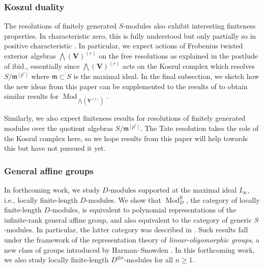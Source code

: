\documentclass[12pt]{amsart}
\newcommand{\bV}{\mathbf{V}}
\newcommand{\fm}{\mathfrak{m}}
\newcommand{\lw}{{\textstyle \bigwedge}}
\DeclareMathOperator{\Mod}{Mod}
\DeclareMathOperator{\lf}{lf}
\numberwithin{equation}{section}
\theoremstyle{definition}
\theoremstyle{plain}
\begin{document}
\subsubsection{Koszul duality}
The resolutions of finitely generated $S$-modules also exhibit interesting finiteness properties. In characteristic zero, this is fully understood \cite[Section~6 and 7]{ss16gl} but only partially so in positive characteristic \cite{gan24lnnr}. In particular, we expect actions of Frobenius twisted exterior algebras $\lw(\bV)^{(r)}$ on the free resolutions as explained in the postlude of ibid., essentially since $\lw(\bV)^{(r)}$ acts on the Koszul complex which resolves $S/\fm^{[p^r]}$ where $\fm \subset S$ is the maximal ideal. In the final subsection, we sketch how the new ideas from this paper can be supplemented to the results of \cite{gan22ext} to obtain similar results for $\Mod_{\lw(\bV^{(r)})}$.

Similarly, we also expect finiteness results for resolutions of finitely generated modules over the quotient algebras $S/\fm^{[p^r]}$. The Tate resolution takes the role of the Koszul complex here, so we hope results from this paper will help towards this but have not pursued it yet.

\subsubsection{General affine groups}
In forthcoming work, we study $D$-modules supported at the maximal ideal $I_{\infty}$, i.e., locally finite-length $D$-modules. We show that $\Mod_D^{\lf}$, the category of locally finite-length $D$-modules, is equivalent to polynomial representations of the infinite-rank general affine group, and also equivalent to the category of generic $S$-modules. In particular, the latter category was described in \cite[Section~4]{gan25pol}. Such results fall under the framework of the representation theory of \textit{linear-oligomorphic groups}, a new class of groups introduced by Harman--Snowden \cite{hs24tensor}. In this forthcoming work, we also study locally finite-length $D^{\otimes n}$-modules for all $n \geq 1$.
\end{document}
